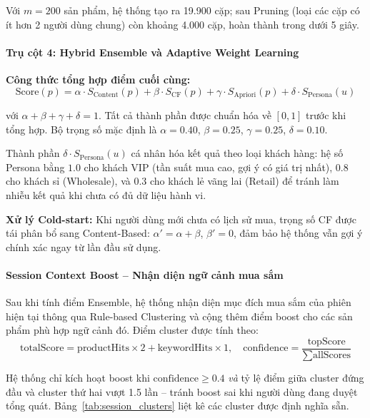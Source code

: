 \documentclass[12pt,a4paper]{report}
\begin{document}
Với $m = 200$ sản phẩm, hệ thống tạo ra 19.900 cặp; sau Pruning (loại các cặp có ít hơn 2 người dùng chung) còn khoảng 4.000 cặp, hoàn thành trong dưới 5 giây.
 
\paragraph{Trụ cột 4: Hybrid Ensemble và Adaptive Weight Learning}
 
\textbf{Công thức tổng hợp điểm cuối cùng:}
\[
\text{Score}(p) = \alpha \cdot S_{\text{Content}}(p) + \beta \cdot S_{\text{CF}}(p) + \gamma \cdot S_{\text{Apriori}}(p) + \delta \cdot S_{\text{Persona}}(u)
\]
 
với $\alpha + \beta + \gamma + \delta = 1$. Tất cả thành phần được chuẩn hóa về $[0, 1]$ trước khi tổng hợp. Bộ trọng số mặc định là $\alpha = 0.40$, $\beta = 0.25$, $\gamma = 0.25$, $\delta = 0.10$.
 
Thành phần $\delta \cdot S_{\text{Persona}}(u)$ cá nhân hóa kết quả theo loại khách hàng: hệ số Persona bằng $1.0$ cho khách VIP (tần suất mua cao, gợi ý có giá trị nhất), $0.8$ cho khách sỉ (Wholesale), và $0.3$ cho khách lẻ vãng lai (Retail) để tránh làm nhiễu kết quả khi chưa có đủ dữ liệu hành vi.
 
\textbf{Xử lý Cold-start:} Khi người dùng mới chưa có lịch sử mua, trọng số CF được tái phân bổ sang Content-Based: $\alpha' = \alpha + \beta$, $\beta' = 0$, đảm bảo hệ thống vẫn gợi ý chính xác ngay từ lần đầu sử dụng.
 
\paragraph{Session Context Boost -- Nhận diện ngữ cảnh mua sắm}
 
Sau khi tính điểm Ensemble, hệ thống nhận diện mục đích mua sắm của phiên hiện tại thông qua Rule-based Clustering và cộng thêm điểm boost cho các sản phẩm phù hợp ngữ cảnh đó. Điểm cluster được tính theo:
\[
\text{totalScore} = \text{productHits} \times 2 + \text{keywordHits} \times 1, \quad
\text{confidence} = \frac{\text{topScore}}{\sum \text{allScores}}
\]
 
Hệ thống chỉ kích hoạt boost khi $\text{confidence} \geq 0.4$ \textit{và} tỷ lệ điểm giữa cluster đứng đầu và cluster thứ hai vượt 1.5 lần -- tránh boost sai khi người dùng đang duyệt tổng quát. Bảng~\ref{tab:session_clusters} liệt kê các cluster được định nghĩa sẵn.
 
\end{document}
